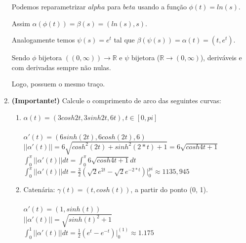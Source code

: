 \documentclass{article}
\begin{document}
\begin{enumerate}
    Podemos reparametrizar $alpha$ para $beta$ usando a função $\phi(t) = ln(s)$. 

    Assim $\alpha(\phi(t)) = \beta(s) = (ln(s), s)$.

    Analogamente temos $\psi(s) = e^t$ tal que $\beta(\psi(s)) = \alpha(t) = (t, e^t)$.

    Sendo $\phi$ bijetora $((0, \infty)) \to \mathbb{R}$ e $\psi$ bijetora ($\mathbb{R} \to (0, \infty)$), deriváveis e com derivadas sempre não nulas.

    Logo, possuem o mesmo traço.

    \item \textbf{(Importante!)} Calcule o comprimento de arco das seguintes curvas:
    \begin{enumerate}[label=(\alph*)]
        \item $\alpha(t) = (3cosh2t, 3sinh2t, 6t), t \in [0, pi]$ \\
        \\
        $\alpha'(t) = (6sinh(2t), 6cosh(2t), 6) $ \\
        $||\alpha'(t)|| = 6\sqrt{cosh^2(2t) + sinh^2(2*t) + 1} = 6\sqrt{cosh{4t} + 1} $ \\
        $\int_{0}^{\pi} ||\alpha'(t)|| dt = \int_{0}^{\pi} 6\sqrt{cosh{4t} + 1} dt $\\
        $\int_{0}^{\pi} ||\alpha'(t)|| dt = \frac{3}{2} (\sqrt{2}e^{2t} - \sqrt{2}e^{-2*t})|_{0}^{pi} \approx 1135,945 $
        \\
        \item Catenária: $\gamma(t) = (t, cosh(t))$, a partir do ponto (0, 1).\\
        \\
        $\alpha'(t) = (1, sinh(t))$ \\
        $||\alpha'(t)|| = \sqrt{sinh(t)^2 + 1} $ \\
        $\int_{0}^{1} ||\alpha'(t)|| dt = \frac{1}{2} (e^{t} - e^{-t})|_{0}^(1) \approx 1.175 $
    \end{enumerate}


\end{enumerate}
\end{document}
